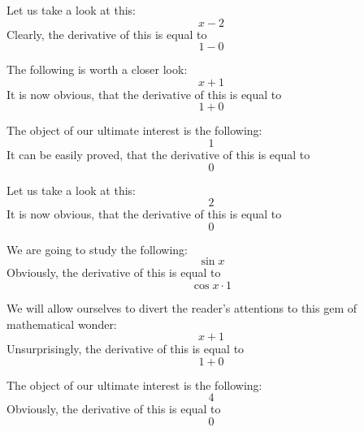 \documentclass{article}
\begin{document}
Let us take a look at this:
\begin{equation}
x - 2 
\end{equation}
Clearly, the derivative of this is equal to
\begin{equation}
1 - 0 
\end{equation}

The following is worth a closer look:
\begin{equation}
x + 1 
\end{equation}
It is now obvious, that the derivative of this is equal to
\begin{equation}
1 + 0 
\end{equation}

The object of our ultimate interest is the following:
\begin{equation}
1 
\end{equation}
It can be easily proved, that the derivative of this is equal to
\begin{equation}
0 
\end{equation}

Let us take a look at this:
\begin{equation}
2 
\end{equation}
It is now obvious, that the derivative of this is equal to
\begin{equation}
0 
\end{equation}

We are going to study the following:
\begin{equation}
\sin x 
\end{equation}
Obviously, the derivative of this is equal to
\begin{equation}
\cos x \cdot 1 
\end{equation}

We will allow ourselves to divert the reader's attentions to this gem of mathematical wonder:
\begin{equation}
x + 1 
\end{equation}
Unsurprisingly, the derivative of this is equal to
\begin{equation}
1 + 0 
\end{equation}

The object of our ultimate interest is the following:
\begin{equation}
4 
\end{equation}
Obviously, the derivative of this is equal to
\begin{equation}
0 
\end{equation}
\end{document}
